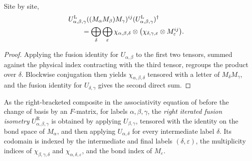 \begin{lemma}%
    \label{thm:mpdo_left_fusion_apply}
    \leanok
    Site by site,
    \begin{align}
         & U^{\mathrm L}_{\alpha,\beta,\gamma}
        ((M_\alpha M_\beta)M_\gamma)^{ij}
        (U^{\mathrm L}_{\alpha,\beta,\gamma})^\dagger
        \notag                                 \\
         & \qquad
        =\bigoplus_{\delta}\bigoplus_{\varepsilon}
        \chi_{\alpha,\beta,\delta}
        \otimes\bigl(\chi_{\delta,\gamma,\varepsilon}
        \otimes M_\varepsilon^{ij}\bigr).
        \notag
    \end{align}
\end{lemma}
\begin{proof}\leanok
    Applying the fusion identity for $U_{\alpha,\beta}$ to the first two
    tensors, summed against the physical index contracting with the third
    tensor, regroups the product over $\delta$. Blockwise conjugation then
    yields $\chi_{\alpha,\beta,\delta}$ tensored with a letter of
    $M_\delta M_\gamma$, and the fusion identity for $U_{\delta,\gamma}$ gives
    the second direct sum.
\end{proof}

\begin{definition}%
    \label{def:mpdo_right_fusion_isometry}
    \leanok
    As the right-bracketed composite in the associativity equation of
    \cite[Section~``Associativity and the pentagon equation'']{Bultinck2017Anyons}
    before the change of basis by an $F$-matrix, for labels
    $\alpha, \beta, \gamma$, the \emph{right iterated fusion isometry}
    $U^{\mathrm R}_{\alpha,\beta,\gamma}$ is obtained by applying
    $U_{\beta,\gamma}$, tensored with the identity on the bond space of
    $M_\alpha$, and then applying $U_{\alpha,\delta}$ for every intermediate
    label $\delta$. Its codomain is indexed by the intermediate and final
    labels $(\delta,\varepsilon)$, the multiplicity indices of
    $\chi_{\beta,\gamma,\delta}$ and $\chi_{\alpha,\delta,\varepsilon}$,
    and the bond index of $M_\varepsilon$.
\end{definition}

